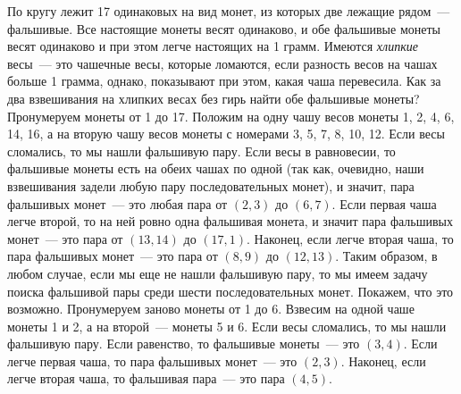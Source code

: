 \problem{}
По кругу лежит 17 одинаковых на вид монет, из которых две лежащие рядом~---
фальшивые.
Все настоящие монеты весят одинаково, и обе фальшивые монеты весят одинаково и
при этом легче настоящих на 1 грамм.
Имеются \emph{хлипкие} весы~--- это чашечные весы, которые ломаются, если
разность весов на чашах больше 1 грамма, однако, показывают при этом, какая
чаша перевесила.
Как за два взвешивания на хлипких весах без гирь найти обе фальшивые монеты?
\solution
Пронумеруем монеты от 1 до 17.
Положим на одну чашу весов монеты 1, 2, 4, 6, 14, 16,
а на вторую чашу весов монеты с номерами 3, 5, 7, 8, 10, 12.
Если весы сломались, то мы нашли фальшивую пару.
Если весы в равновесии, то фальшивые монеты есть на обеих чашах по одной
(так как, очевидно, наши взвешивания задели любую пару последовательных монет),
и значит, пара фальшивых монет~--- это любая пара от $(2, 3)$ до $(6, 7)$.
Если первая чаша легче второй, то на ней ровно одна фальшивая монета,
и значит пара фальшивых монет~--- это пара от $(13, 14)$ до $(17, 1)$.
Наконец, если легче вторая чаша, то пара фальшивых монет~--- это пара
от $(8, 9)$ до $(12, 13)$.
Таким образом, в любом случае, если мы еще не нашли фальшивую пару, то мы имеем
задачу поиска фальшивой пары среди шести последовательных монет.
Покажем, что это возможно.
Пронумеруем заново монеты от 1 до 6.
Взвесим на одной чаше монеты 1 и 2, а на второй~--- монеты 5 и 6.
Если весы сломались, то мы нашли фальшивую пару.
Если равенство, то фальшивые монеты~--- это $(3, 4)$.
Если легче первая чаша, то пара фальшивых монет~--- это $(2, 3)$.
Наконец, если легче вторая чаша, то фальшивая пара~--- это пара $(4, 5)$.
\endproblem
